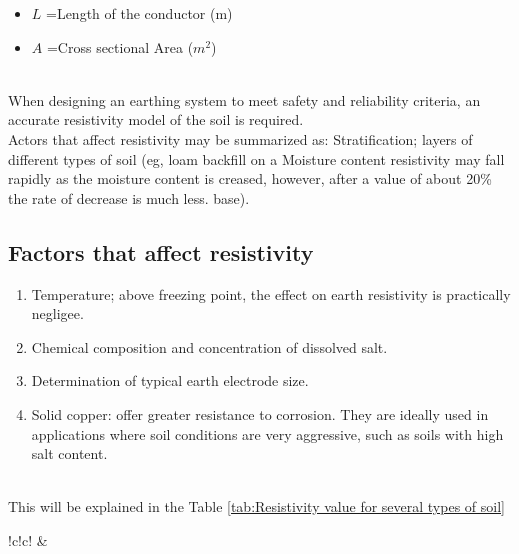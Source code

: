 \documentclass[12pt,fleqn]{book} %
\begin{document}
\begin{enumerate}
\begin{itemize}
        \item $L$ =Length of the conductor (m)
        \item $A$ =Cross sectional Area ($m^2$)
    \end{itemize}
  \\  When designing an earthing system to meet safety and reliability criteria, an accurate resistivity model of the soil is required.
  \\ Actors that affect resistivity may be summarized as: Stratification; layers of different types of soil (eg, loam backfill on a Moisture content resistivity may fall rapidly as the moisture content is creased, however, after a value of about 20\% the rate of decrease is much less. base).
  \subsection{Factors that affect resistivity}
  \begin{enumerate}
      \item Temperature; above freezing point, the effect on earth resistivity is practically negligee.
      \item Chemical composition and concentration of dissolved salt.
      \item Determination of typical earth electrode size.
      \item Solid copper: offer greater resistance to corrosion. They are ideally used in applications where soil conditions are very aggressive, such as soils with high salt content.
  \end{enumerate}
  \\ This will be explained in the Table \ref{tab:Resistivity value for several types of soil}
  \begin{table}[!h]
\centering
\caption{Resistivity Value For Several Types of Soil}
\label{tab:Resistivity value for several types of soil}
\begin{tabular}{!{\color[rgb]{0.557,0.667,0.859}\vrule}c!{\color{black}\vrule}c!{\color[rgb]{0.557,0.667,0.859}\vrule}} 
\hline
{}  &   \\ 

\end{tabular}
\end{table}
\end{enumerate}
\end{document}
